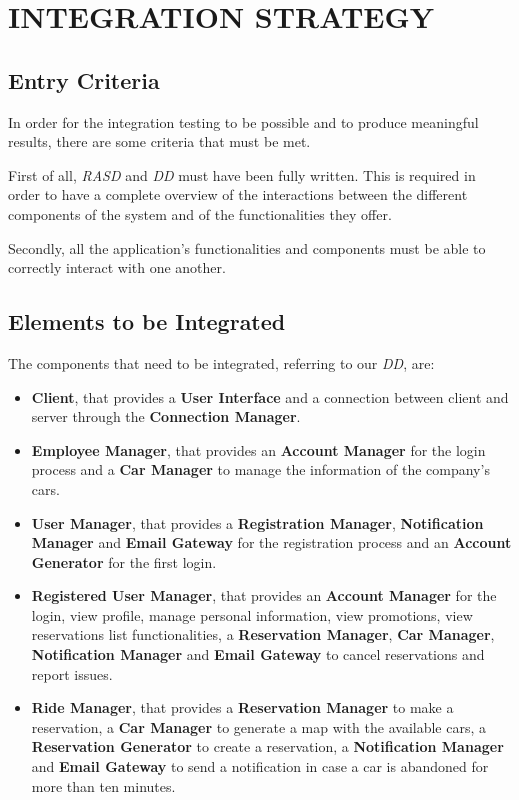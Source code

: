 \section{INTEGRATION STRATEGY}
\label{integrationstrategy}
\subsection{Entry Criteria}
In order for the integration testing to be possible and to produce meaningful results, there are some criteria that  must be met.

First of all, \textit{RASD} and \textit{DD} must have been fully written. This is required in order to have a complete overview of the interactions between the different components of the system and of the functionalities they offer.

Secondly, all the application's functionalities and components must be able to correctly interact with one another. 
   
\subsection{Elements to be Integrated}
The components that need to be  integrated, referring to our \textit{DD}, are:

\begin{itemize}
	\item \textbf{Client}, that provides a \textbf{User Interface} and a connection between client and server through the \textbf{Connection Manager}. 
	\item \textbf{Employee Manager}, that provides an \textbf{Account Manager} for the login process and a \textbf{Car Manager} to manage the information of the company's cars.
	\item \textbf{User Manager}, that provides a \textbf{Registration Manager}, \textbf{Notification Manager} and \textbf{Email Gateway} for the registration process and an \textbf{Account Generator} for the first login.
	\item \textbf{Registered User Manager}, that provides an \textbf{Account Manager} for the login, view profile, manage personal information, view promotions, view reservations list functionalities, a \textbf{Reservation Manager}, \textbf{Car Manager}, \textbf{Notification Manager} and \textbf{Email Gateway} to cancel reservations and report issues.
	\item \textbf{Ride Manager}, that provides a \textbf{Reservation Manager} to make a reservation, a \textbf{Car Manager} to generate a map with the available cars, a \textbf{Reservation Generator} to create a reservation, a \textbf{Notification Manager} and \textbf{Email Gateway} to send a notification in case a car is abandoned for more than ten minutes.
\end{itemize}
\newpage
